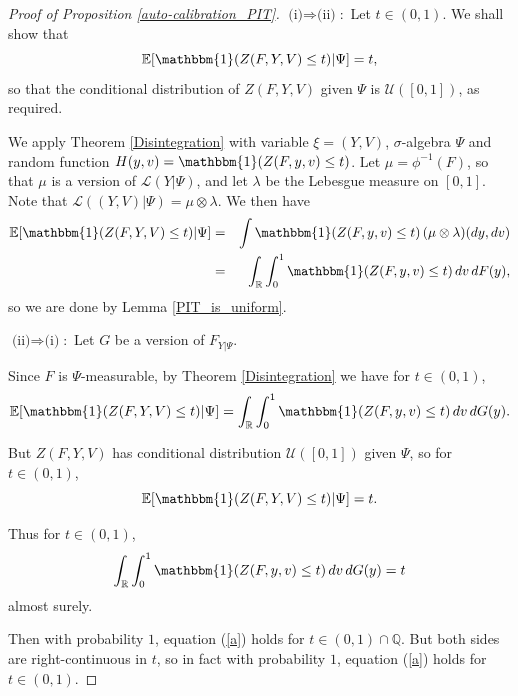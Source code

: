 \documentclass[aap]{imsart}
\theoremstyle{plain}
\theoremstyle{definition}
\begin{document}
\begin{appendix}
  \begin{proof}[Proof of Proposition \ref{auto-calibration_PIT}] $\text{(i)} \Rightarrow \text{(ii)}$:\, Let $t \in (0,1)$. We shall show that
\begin{equation*}
  \mathbb{E}[\mathbbm{1}(Z(F,Y,V) \leq t)|\Psi] = t,
\end{equation*}
  so that the conditional distribution of $Z(F,Y,V)$ given $\Psi$ is $\mathcal{U}([0,1])$, as required.

  We apply Theorem \ref{Disintegration} with variable $\xi = (Y,V)$, $\sigma$-algebra $\Psi$ and random function $H(y,v) = \mathbbm{1}(Z(F,y,v) \leq t)$. Let $\mu = \phi^{-1}(F)$, so that $\mu$ is a version of $\mathcal{L}(Y|\Psi)$, and let $\lambda$ be the Lebesgue measure on $[0,1]$. Note that $\mathcal{L}((Y,V)|\Psi) = \mu \otimes \lambda$. We then have
\begin{eqnarray*}
  \mathbb{E}[\mathbbm{1}(Z(F,Y,V) \leq t)|\Psi] & = & \int \mathbbm{1}(Z(F,y,v) \leq t) \,(\mu \otimes \lambda)(dy,dv) \\
                                                & = & \int_\mathbb{R} \int_0^1 \mathbbm{1}(Z(F,y,v) \leq t) \,dv \,dF(y),
\end{eqnarray*}
  so we are done by Lemma \ref{PIT_is_uniform}.

$\text{(ii)} \Rightarrow \text{(i)}$:\, Let $G$ be a version of $F_{Y|\Psi}$.

  Since $F$ is $\Psi$-measurable, by Theorem \ref{Disintegration} we have for $t \in (0,1)$,
\begin{equation*}
  \mathbb{E}[\mathbbm{1}(Z(F, Y, V) \leq t)|\Psi] = \int_\mathbb{R} \int_0^1 \mathbbm{1}(Z(F, y, v) \leq t) \,dv \,dG(y).
\end{equation*}

  But $Z(F, Y, V)$ has conditional distribution $\mathcal{U}([0,1])$ given $\Psi$, so for $t \in (0,1)$,
\begin{equation*}
\mathbb{E}[\mathbbm{1}(Z(F, Y, V) \leq t)|\Psi] = t.
\end{equation*}

  Thus for $t \in (0,1)$,
\begin{equation}\label{a}
  \int_\mathbb{R} \int_0^1 \mathbbm{1}(Z(F, y, v) \leq t) \,dv \,dG(y) = t
\end{equation}
almost surely.

  Then with probability $1$, equation (\ref{a}) holds for $t \in (0,1) \cap \mathbb{Q}$. But both sides are right-continuous in $t$, so in fact with probability $1$, equation (\ref{a}) holds for $t \in (0,1)$.


\end{proof}
\end{appendix}
\end{document}
